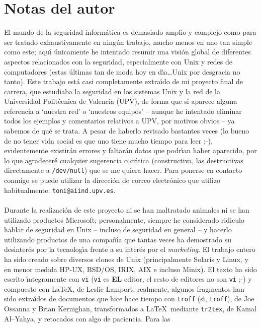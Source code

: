\chapter{Notas del autor}
El mundo de la seguridad inform\'atica es demasiado amplio y complejo como para
ser tratado exhaustivamente en ning\'un trabajo, mucho menos en uno tan simple
como este; aqu\'{\i} \'unicamente he intentado resumir
una visi\'on global de diferentes aspectos relacionados con la seguridad, 
especialmente con Unix y redes de computadores (estas \'ultimas tan de moda hoy
en d\'{\i}a\ldots Unix por desgracia no tanto). Este trabajo est\'a casi 
completamente extra\'{\i}do de mi proyecto final de carrera, que estudiaba la
seguridad en los sistemas Unix y la red de la Universidad Polit\'ecnica
de Valencia (UPV), de forma que si aparece alguna referencia a `nuestra red' o
`nuestros equipos' -- aunque he intentado eliminar todos los ejemplos y 
comentarios relativos a UPV, por motivos obvios -- ya sabemos de qu\'e se 
trata. A pesar de haberlo revisado bastantes veces (lo bueno de no tener vida 
social es que uno tiene mucho tiempo para leer ;-), evidentemente 
existir\'an errores y faltar\'an datos que podr\'{\i}an haber aparecido, por lo 
que agradecer\'e cualquier
sugerencia o cr\'{\i}tica (constructiva, las destructivas directamente a 
{\tt /dev/null}) que se me quiera hacer. Para ponerse en contacto conmigo
se puede utilizar la direcci\'on de correo electr\'onico que utilizo 
habitualmente: {\tt toni@aiind.upv.es}.\\ 
\\Durante la realizaci\'on de este proyecto ni se han maltratado animales ni
se han utilizado productos Microsoft; personalmente, siempre he considerado 
rid\'{\i}culo
hablar de seguridad en Unix -- incluso de seguridad en general -- y hacerlo
utilizando productos de una compa\~n\'{\i}a que tantas veces ha demostrado su
desinter\'es por la tecnolog\'{\i}a frente a su inter\'es por el {\it 
marketing}. 
El trabajo entero ha sido creado sobre diversos clones de Unix (principalmente
Solaris y Linux, y en menor medida HP-UX, BSD/OS, IRIX, AIX e incluso Minix). 
El texto ha sido escrito \'{\i}ntegramente con {\tt vi} ({\tt vi} es {\bf EL} 
editor, el resto de editores no son {\tt vi} ;-) y compuesto
con \LaTeX, de Leslie Lamport; realmente, algunos fragmentos han sido 
extra\'{\i}dos de documentos que hice hace tiempo con {\tt troff} (s\'{\i}, 
{\tt troff}), de Joe Ossanna y Brian Kernighan, transformados a \LaTeX\ mediante
{\tt tr2tex}, de Kamal Al--Yahya, y retocados con algo de paciencia. Para las 

